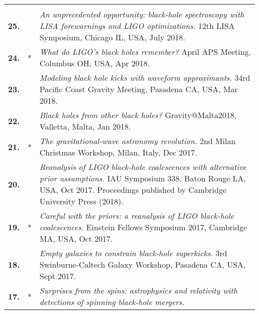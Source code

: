 \documentclass[a4paper]{moderncv}
\begin{document}
{\begin{longtable}{rp{0.4cm}p{15.8cm}}
\vspace{0.05cm}\\
%
\textbf{25.} & & \textit{An unprecedented opportunity: black-hole spectroscopy with LISA forewarnings and LIGO optimizations.}
\newline{} 12th LISA Symposium, Chicago IL, USA, July 2018.
\vspace{0.05cm}\\
%
\textbf{24.} & * & \textit{What do LIGO's black holes remember?}
\newline{} April APS Meeting, Columbus OH, USA, Apr 2018.
\vspace{0.05cm}\\
%
\textbf{23.} & & \textit{Modeling black hole kicks with waveform approximants.}
\newline{} 34rd Pacific Coast Gravity Meeting, Pasadena CA, USA, Mar 2018.
\vspace{0.05cm}\\
%
\textbf{22.} & & \textit{Black holes from other black holes?}
\newline{} Gravity@Malta2018, Valletta, Malta, Jan 2018.
\vspace{0.05cm}\\
%
\textbf{21.} & * & \textit{The gravitational-wave astronomy revolution.}
\newline{} 2nd Milan Christmas Workshop, Milan, Italy, Dec 2017.
\vspace{0.05cm}\\
%
\textbf{20.} &  & \textit{Reanalysis of LIGO black-hole coalescences with alternative prior assumptions.}
\newline{} IAU Symposium 338, Baton Rouge LA, USA, Oct 2017.
\newline{}Proceedings published by Cambridge University Press (2018).
\vspace{0.05cm}\\
%
\textbf{19.} & * & \textit{Careful with the priors: a reanalysis of LIGO black-hole coalescences.}
\newline{} Einstein Fellows Symposium 2017, Cambridge MA, USA, Oct 2017.
\vspace{0.05cm}\\
%
\textbf{18.} & & \textit{Empty galaxies to constrain black-hole superkicks.}
\newline{} 3rd Swinburne-Caltech Galaxy Workshop, Pasadena CA, USA, Sept 2017.
\vspace{0.05cm}\\
%
\textbf{17.} & * & \textit{Surprises from the spins: astrophysics and relativity with detections of spinning black-hole mergers.}

\end{longtable}}
\end{document}
